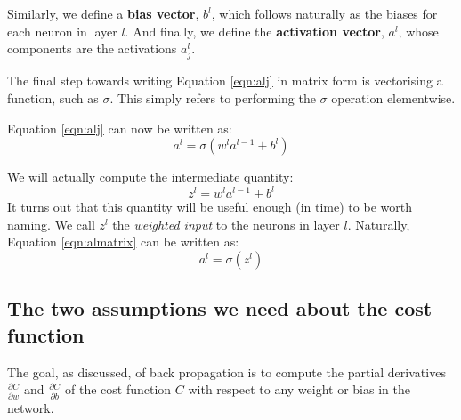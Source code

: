\documentclass[11pt]{article}
\begin{document}
Similarly, we define a \textbf{bias vector}, \(b^l\), which follows naturally as the biases for each neuron in layer \(l\). And finally, we define the \textbf{activation vector}, \(a^l\), whose components are the activations \(a^l_j\).

The final step towards writing Equation \ref{eqn:alj} in matrix form is vectorising a function, such as \(\sigma\). This simply refers to performing the \(\sigma\) operation elementwise.

\vspace{0.3cm}

Equation \ref{eqn:alj} can now be written as:
\begin{equation} \label{eqn:almatrix}
a^l = \sigma(w^l a^{l-1} + b^l)
\end{equation}

We will actually compute the intermediate quantity:
\begin{equation}
  z^l = w^l a^{l-1} + b^l
\end{equation}
It turns out that this quantity will be useful enough (in time) to be worth naming. We call \(z^l\) the \emph{weighted input} to the neurons in layer \(l\). Naturally, Equation \ref{eqn:almatrix} can be written as:
\begin{equation} 
a^l = \sigma(z^l)
\end{equation}


\subsection{The two assumptions we need about the cost function}
\label{sec:orgc244547}
The goal, as discussed, of back propagation is to compute the partial derivatives \(\frac{\partial C}{\partial w}\) and \(\frac{\partial C}{\partial b}\) of the cost function \(C\) with respect to any weight or bias in the network. 
\end{document}

